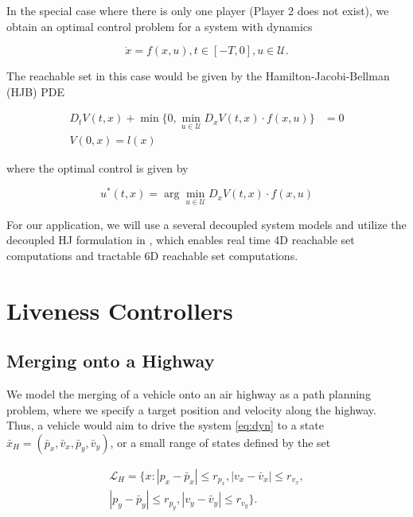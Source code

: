 In the special case where there is only one player (Player 2 does not exist), we obtain an optimal control problem for a system with dynamics

\begin{equation} \label{eq:dyn_d}
\dot{x} = f(x, u), t\in [-T,0], u\in\mathcal U.
\end{equation}

The reachable set in this case would be given by the Hamilton-Jacobi-Bellman (HJB) PDE

\begin{equation} \label{eq:HJBPDE}
\begin{aligned}
D_t V(t,x) + \min \{0, \min_{u\in\mathcal{U}} D_x V(t,x) \cdot f(x,u)\} &= 0 \\
V(0,x) = l(x)&
\end{aligned}
\end{equation}

\noindent where the optimal control is given by

\begin{equation} \label{eq:HJB_ctrl_syn}
u^*(t,x) = \arg \min_{u\in\mathcal{U}} D_x V(t,x) \cdot f(x,u)
\end{equation}

For our application, we will use a several decoupled system models and utilize the decoupled HJ formulation in \cite{Chen15}, which enables real time 4D reachable set computations and tractable 6D reachable set computations.

\section{Liveness Controllers \label{sec:liveness}}
\subsection{Merging onto a Highway \label{subsec:highway_merge}}
We model the merging of a vehicle onto an air highway as a path planning problem, where we specify a target position and velocity along the highway. Thus, a vehicle would aim to drive the system \eqref{eq:dyn} to a state $\bar{x}_H=(\bar{p}_x, \bar{v}_x, \bar{p}_y, \bar{v}_y)$, or a small range of states defined by the set

\begin{equation}
\begin{aligned}
\mathcal{L}_H = \{x: |p_x-\bar{p}_x|\le r_{p_x}, |v_x-\bar{v}_x|\le r_{v_x}, \\
|p_y - \bar{p}_y| \le r_{p_y}, |v_y - \bar{v}_y|\le r_{v_y} \}.
\end{aligned}
\end{equation}

